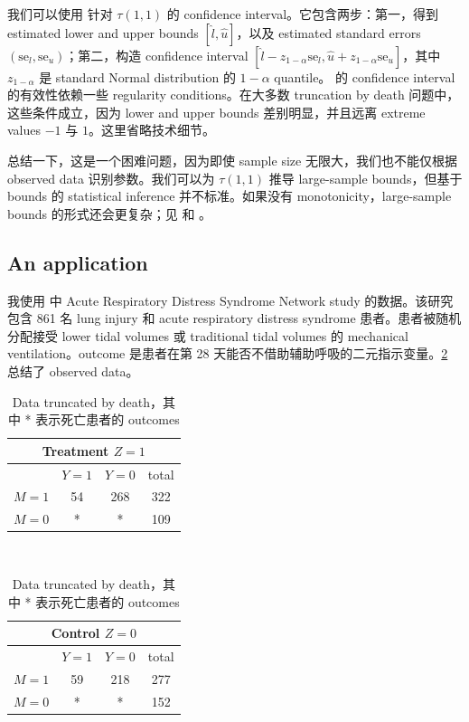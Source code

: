 我们可以使用 \citet{imbens2004confidence} 针对 $\tau(1,1)$ 的 confidence interval。它包含两步：第一，得到 estimated lower and upper bounds $[\hat{l},\hat{u}]$，以及 estimated standard errors $(\text{se}_l,\text{se}_u)$；第二，构造 confidence interval
$[\hat{l}-z_{1-\alpha}\text{se}_l,\hat{u}+z_{1-\alpha}\text{se}_u]$，其中 $z_{1-\alpha}$ 是 standard Normal distribution 的 $1-\alpha$ quantile。\citet{imbens2004confidence} 的 confidence interval 的有效性依赖一些 regularity conditions。在大多数 truncation by death 问题中，这些条件成立，因为 lower and upper bounds 差别明显，并且远离 extreme values $-1$ 与 $1$。这里省略技术细节。



总结一下，这是一个困难问题，因为即使 sample size 无限大，我们也不能仅根据 observed data 识别参数。我们可以为 $\tau(1,1)$ 推导 large-sample bounds，但基于 bounds 的 statistical inference 并不标准。如果没有 monotonicity，large-sample bounds 的形式还会更复杂；见 \citet{zhang2003estimation} 和 \citet[][Appendix A]{jiang2016principal}。




\subsection{An application}\label{section::ps-application}


我使用 \citet{yang2016using} 中 Acute Respiratory Distress Syndrome Network study 的数据。该研究包含 861 名 lung injury 和 acute respiratory distress syndrome 患者。患者被随机分配接受 lower tidal volumes 或 traditional tidal volumes 的 mechanical ventilation。outcome 是患者在第 28 天能否不借助辅助呼吸的二元指示变量。\cref{tb::truncationbydeath} 总结了 observed data。


\begin{table} 
\centering 
\caption{Data truncated by death，其中 * 表示死亡患者的 outcomes}\label{tb::truncationbydeath}
\begin{tabular}{cccc}
\hline 
\multicolumn{4}{c}{ Treatment $Z=1$} \\
\hline 
 & $Y=1$ & $Y=0$ &  total\\
$M=1$ &    54 & 268& 322 \\
$M=0$  & * & * & 109 \\
\hline 
\end{tabular}
~~~~~
\begin{tabular}{cccc}
\hline 
\multicolumn{4}{c}{ Control $Z=0$} \\
\hline 
 & $Y=1$ & $Y=0$ &total \\
$M=1$ &    59 & 218&  277 \\
$M=0$  & * & *& 152 \\
\hline 
\end{tabular}
\end{table}

